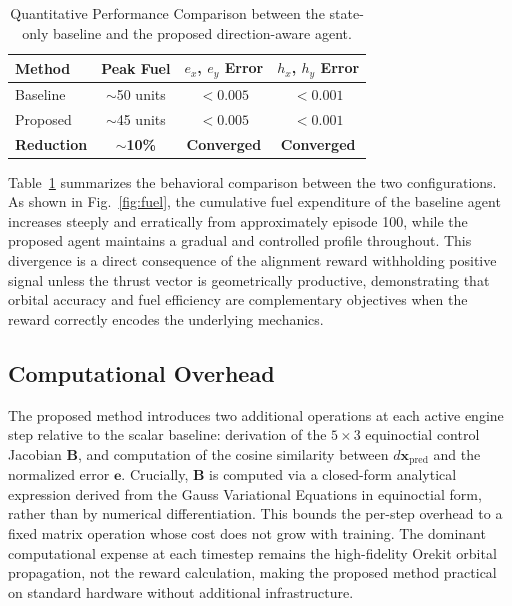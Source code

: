 \documentclass[paper]{ieice}
\begin{document}
\begin{table}[tb]
\caption{Quantitative Performance Comparison between the state-only baseline and the proposed direction-aware agent.}
\label{tab:fuel_results}
\begin{center}
\begin{tabular}{|l|c|c|c|}
\hline
\textbf{Method} & \textbf{Peak Fuel} & \textbf{$e_x$, $e_y$ Error} & \textbf{$h_x$, $h_y$ Error} \\
\hline
Baseline & $\sim$50 units & $< 0.005$ & $< 0.001$ \\
Proposed & $\sim$45 units & $< 0.005$ & $< 0.001$ \\
\hline
\textbf{Reduction} & \textbf{$\sim$10\%} & \textbf{Converged} & \textbf{Converged} \\
\hline
\end{tabular}
\end{center}
\end{table}

Table~\ref{tab:fuel_results} summarizes the behavioral comparison between the two configurations. As shown in Fig.~\ref{fig:fuel}, the cumulative fuel expenditure of the baseline agent increases steeply and erratically from approximately episode 100, while the proposed agent maintains a gradual and controlled profile throughout. This divergence is a direct consequence of the alignment reward withholding positive signal unless the thrust vector is geometrically productive, demonstrating that orbital accuracy and fuel efficiency are complementary objectives when the reward correctly encodes the underlying mechanics.

\subsection{Computational Overhead}

The proposed method introduces two additional operations at each active engine step relative to the scalar baseline: derivation of the $5 \times 3$ equinoctial control Jacobian $\mathbf{B}$, and computation of the cosine similarity between $d\mathbf{x}_{\mathrm{pred}}$ and the normalized error $\mathbf{e}$. Crucially, $\mathbf{B}$ is computed via a closed-form analytical expression derived from the Gauss Variational Equations in equinoctial form, rather than by numerical differentiation. This bounds the per-step overhead to a fixed matrix operation whose cost does not grow with training. The dominant computational expense at each timestep remains the high-fidelity Orekit orbital propagation, not the reward calculation, making the proposed method practical on standard hardware without additional infrastructure.
\end{document}
